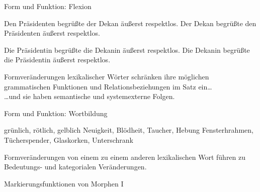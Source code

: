 \begin{frame}
  {Form und Funktion: Flexion}
  \pause
  \begin{exe}
    \ex
    \begin{xlist}
      \ex \alert{Den Präsidenten} begrüßte \alert{der Dekan} äußerst respektlos.
      \pause
      \ex \alert{Der Dekan} begrüßte \alert{den Präsidenten} äußerst respektlos.
    \end{xlist}
    \pause
    \ex
    \begin{xlist}
      \ex \alert{Die Präsidentin} begrüßte \alert{die Dekanin} äußerst respektlos.
      \pause
      \ex \alert{Die Dekanin} begrüßte \alert{die Präsidentin} äußerst respektlos.
    \end{xlist}
  \end{exe}
  \pause
  \Zeile
  Formveränderungen lexikalischer Wörter \alert{schränken ihre möglichen grammatischen Funktionen und Relationsbeziehungen im Satz ein}\dots\\
  \pause
  \Halbzeile
  \dots und sie haben semantische und systemexterne Folgen.

\end{frame}

\begin{frame}
  {Form und Funktion: Wortbildung}
  \pause
  \begin{exe}
    \ex grün\alert{lich}, röt\alert{lich}, gelb\alert{lich}
    \pause
    \ex Neu\alert{igkeit}, Blöd\alert{heit}, Tauch\alert{er}, Heb\alert{ung}
    \pause
    \ex Fensterh\alert{rahmen}, Tücher\alert{spender}, Glas\alert{korken}, Unter\alert{schrank}
  \end{exe}
  \pause
  \Zeile
  Formveränderungen von einem zu einem anderen lexikalischen Wort führen zu Bedeutungs- und kategorialen Veränderungen.
\end{frame}

\begin{frame}
  {Markierungsfunktionen von Morphen I}
  \pause
  \begin{exe}
    \ex
    \begin{xlist}
    \end{xlist}
    \pause
    \ex
    \begin{xlist}
    \end{xlist}
  \end{exe}
\end{frame}

